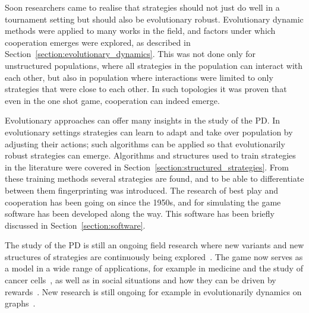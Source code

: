 Soon researchers came to realise that strategies should not just do well in a tournament setting
but should also be evolutionary robust. Evolutionary dynamic methods were
applied to many works in the field, and factors under which cooperation
emerges were explored, as described in Section~\ref{section:evolutionary_dynamics}.
This was not done only for unstructured populations, where all strategies
in the population can interact with each other, but also in population where
interactions were limited to only strategies that were close to each other.
In such topologies it was proven that even in the one shot game, cooperation can
indeed emerge.

Evolutionary approaches can offer many insights in the study of the PD. In
evolutionary settings strategies can learn to adapt and take over population by
adjusting their actions; such algorithms can be applied so that evolutionarily
robust strategies can emerge. Algorithms and structures used to train strategies
in the literature were covered in Section~\ref{section:structured_strategies}.
From these training methods several strategies are found,
and to be able to differentiate between them fingerprinting was
introduced. The research of best play and cooperation has been going on since
the 1950s, and for simulating the game software has been developed along the
way. This software has been briefly discussed
in Section~\ref{section:software}.

The study of the PD is still an ongoing field research where new variants and
new structures of strategies are
continuously being explored~\cite{Ohtsuki2018}. The game now serves as a model
in a wide range of applications, for example in medicine and the study of cancer
cells~\cite{archetti2018, Kaznatchee2017}, as well as in social situations and
how they can be driven by rewards~\cite{Dridi2018}. New research is still ongoing
for example in evolutionarily dynamics on graphs~\cite{Allen2017, hathcock2018,
Liu2017}.

% 
% 